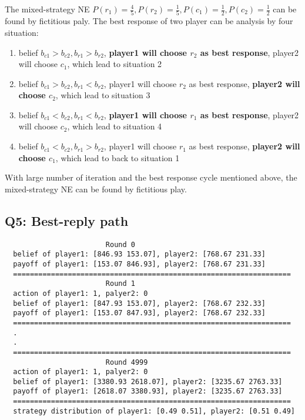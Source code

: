 \documentclass[a4paper, oneside, final, 12pt]{scrartcl} %
\begin{document}
\begingroup
\raggedright
The mixed-strategy NE $P(r_1) = \frac{4}{5}, P(r_2) = \frac{1}{5}, 
P(c_1) = \frac{1}{2}, P(c_2) = \frac{1}{2}$ can be found by fictitious paly.
The best response of two player can be analysis by four situation:
\begin{enumerate}
  \item belief $b_{c1} > b_{c2}, b_{r1} > b_{r2}$, 
  \textbf{player1 will choose $r_2$ as best response}, player2 will choose $c_1$, 
  which lead to situation 2
  \item belief $b_{c1} > b_{c2}, b_{r1} < b_{r2}$,
  player1 will choose $r_2$ as best response, \textbf{player2 will choose $c_2$}, 
  which lead to situation 3
  \item belief $b_{c1} < b_{c2}, b_{r1} < b_{r2}$,
  \textbf{player1 will choose $r_1$ as best response}, player2 will choose $c_2$, 
  which lead to situation 4
  \item belief $b_{c1} < b_{c2}, b_{r1} > b_{r2}$,
  player1 will choose $r_1$ as best response, \textbf{player2 will choose $c_1$}, 
  which lead to back to situation 1
\end{enumerate}
With large number of iteration and the best response cycle mentioned above, 
the mixed-strategy NE can be found by fictitious play.
\endgroup

\subsection{Q5: Best-reply path}

\begin{lstlisting}
                        Round 0
  belief of player1: [846.93 153.07], player2: [768.67 231.33]
  payoff of player1: [153.07 846.93], player2: [768.67 231.33]
  ==================================================================
                        Round 1
  action of player1: 1, palyer2: 0
  belief of player1: [847.93 153.07], player2: [768.67 232.33]
  payoff of player1: [153.07 847.93], player2: [768.67 232.33]
  ==================================================================
  .
  .
  ==================================================================
                        Round 4999
  action of player1: 1, palyer2: 0
  belief of player1: [3380.93 2618.07], player2: [3235.67 2763.33]
  payoff of player1: [2618.07 3380.93], player2: [3235.67 2763.33]
  ==================================================================
  strategy distribution of player1: [0.49 0.51], player2: [0.51 0.49]
\end{lstlisting}
\end{document}
